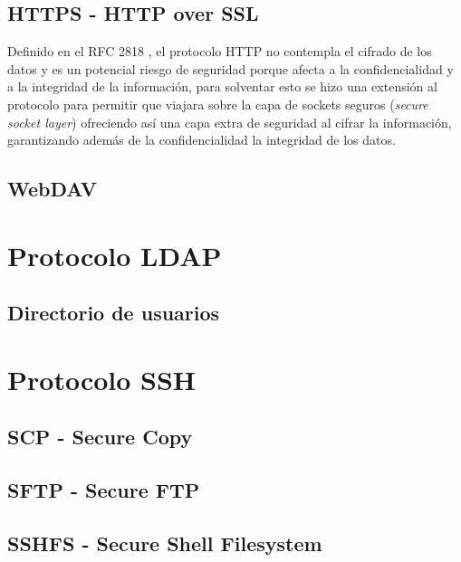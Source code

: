 
  \subsection {HTTPS - HTTP over SSL}

Definido en el RFC 2818 \cite{rfc2818}, el protocolo HTTP no contempla el cifrado de los datos y es un potencial riesgo de seguridad porque afecta a la confidencialidad y a la integridad de la informaci\'{o}n, para solventar esto se hizo una extensi\'{o}n al protocolo para permitir que viajara sobre la capa de sockets seguros (\textit{secure socket layer}) ofreciendo as\'{i} una capa extra de seguridad al cifrar la informaci\'{o}n, garantizando adem\'{a}s de la confidencialidad la integridad de los datos.


  \subsection {WebDAV}

\section {Protocolo LDAP}
  \subsection {Directorio de usuarios}
\section {Protocolo SSH}
  \subsection {SCP - Secure Copy}
  \subsection {SFTP - Secure FTP}
  \subsection {SSHFS - Secure Shell Filesystem}

